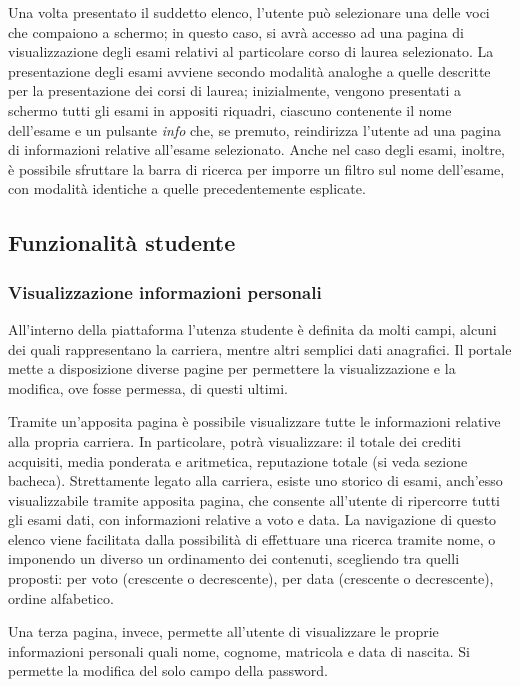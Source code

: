 \documentclass [a4paper,11pt]{book}
\begin{document}
Una volta presentato il suddetto elenco, l'utente può selezionare una delle voci che compaiono a schermo; in questo caso, si avrà accesso ad una pagina di visualizzazione degli esami relativi al particolare corso di laurea selezionato. La presentazione degli esami avviene secondo modalità analoghe a quelle descritte per la presentazione dei corsi di laurea; inizialmente, vengono presentati a schermo tutti gli esami in appositi riquadri, ciascuno contenente il nome dell'esame e un pulsante \emph{info} che, se premuto, reindirizza l'utente ad una pagina di informazioni relative all'esame selezionato. Anche nel caso degli esami, inoltre, è possibile sfruttare la barra di ricerca per imporre un filtro sul nome dell'esame, con modalità identiche a quelle precedentemente esplicate.

\medskip

\subsection{Funzionalità studente}

\subsubsection{Visualizzazione informazioni personali}

All’interno della piattaforma l’utenza studente è definita da molti campi, alcuni dei quali rappresentano la carriera, mentre altri semplici dati anagrafici. Il portale mette a disposizione diverse pagine per permettere la visualizzazione e la modifica, ove fosse permessa, di questi ultimi.

Tramite un’apposita pagina è possibile visualizzare tutte le informazioni relative alla propria carriera. In particolare, potrà visualizzare: il totale dei crediti acquisiti, media ponderata e aritmetica, reputazione totale (si veda sezione bacheca). Strettamente legato alla carriera, esiste uno storico di esami, anch’esso visualizzabile tramite apposita pagina, che consente all’utente di ripercorre tutti gli esami dati, con informazioni relative a voto e data. La navigazione di questo elenco viene facilitata dalla possibilità di effettuare una ricerca tramite nome, o imponendo un diverso un ordinamento dei contenuti, scegliendo tra quelli proposti: per voto (crescente o decrescente), per data (crescente o decrescente), ordine alfabetico.

Una terza pagina, invece, permette all’utente di visualizzare le proprie informazioni personali quali nome, cognome, matricola e data di nascita. Si permette la modifica del solo campo della password.
\end{document}
